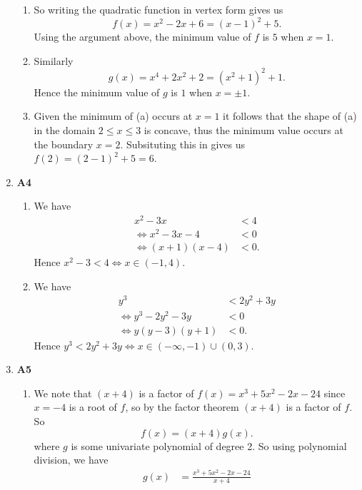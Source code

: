 \documentclass[12pt,oneside]{book}
\begin{document}
\begin{enumerate}
            \begin{enumerate}
            \item So writing the quadratic function in vertex form gives us \[
                f(x) = x^2 - 2x + 6 = (x - 1)^2 + 5
            .\]
            Using the argument above, the minimum value of $f$ is $5$ when $x = 1$.
            \item Similarly \[
                g(x) = x^4 + 2x^2 + 2 = (x^2 + 1)^2 + 1
            .\] Hence the minimum value of $g$ is $1$ when $x = \pm 1$.
            \item Given the minimum of (a) occurs at $x = 1$ it follows that the shape of (a) in the domain $2 \leq x \leq 3$ is concave, thus the minimum value occurs at the boundary $x = 2$. Subsituting this in gives us $f(2) = (2 - 1)^2 + 5 = 6$.
        \end{enumerate}
        \item \textbf{A4} \begin{enumerate}
            \item We have \begin{align*}
                x^2 - 3x &< 4 \\
                \iff x^2 - 3x - 4 &< 0 \\
                \iff (x + 1) (x - 4) &< 0.
            \end{align*}
            Hence $x^2 - 3 < 4 \iff x \in (-1, 4)$.
            \item We have \begin{align*}
                y^3 &< 2y^2 + 3y \\
                \iff y^3 - 2y^2 - 3y &< 0 \\
                \iff y(y - 3)(y + 1) &< 0.
            \end{align*}
            Hence $y^3 < 2y^2 + 3y \iff x \in (- \infty, -1) \cup (0,3) $.
        \end{enumerate}
        \item \textbf{A5} \begin{enumerate}
            \item We note that $(x+4)$ is a factor of  $f(x) = x^3 + 5x^2 - 2x -24$ since $x = -4$ is a root of $f$, so by the factor theorem $(x + 4)$ is a factor of $f$. So \[
                f(x) = (x+4)g(x) 
            .\] where $g$ is some univariate polynomial of degree 2. So using polynomial division, we have \begin{align*}
                g(x) &= \frac{x^3 + 5x^2 - 2x - 24}{x + 4} \\

\end{align*}
\end{enumerate}
\end{enumerate}
\end{document}
